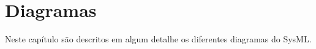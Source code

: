 \chapter{Diagramas}\label{CAP2}

Neste capítulo são descritos em algum detalhe os diferentes diagramas do SysML. 

\let\clearpage\relax


